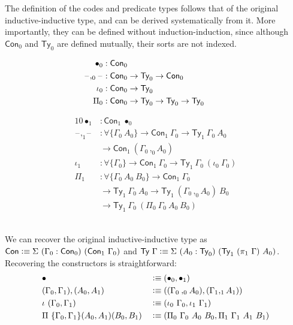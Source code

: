 \documentclass[autoref]{llncs}
\newcommand{\GG}{\Gamma}
\newcommand{\blank}{\mathord{\hspace{1pt}\text{--}\hspace{1pt}}}
\newcommand{\defeq}{\mathrel{\vcentcolon\equiv}}
\begin{document}
The definition of the codes and predicate types follows that of the original
inductive-inductive type, and can be derived systematically from it. More
importantly, they can be defined without induction-induction, since although
$\textsf{Con}_0$ and $\textsf{Ty}_0$ are defined mutually, their sorts are not
indexed. \\
\vspace{-0.2em}
\begin{minipage}{0.4\textwidth}
\begin{align*}
  \bullet_0 &: \textsf{Con}_0 \\
  \blank,_0\blank &: \textsf{Con}_0 \to \textsf{Ty}_0 \to \textsf{Con}_0 \\
  \iota_0 &: \textsf{Con}_0 \to \textsf{Ty}_0 \\
  \Pi_0 &: \textsf{Con}_0 \to \textsf{Ty}_0 \to \textsf{Ty}_0 \to \textsf{Ty}_0 \hspace{2.8em} \\
\end{align*}
\end{minipage}
\begin{minipage}{0.5\textwidth}
\vspace{-1.3em}
\begin{alignat*}{10}
  \bullet_1 &: \textsf{Con}_1\ \bullet_0 \\
  \blank,_1\blank &: \forall\{\GG_0\ A_0\} \to \textsf{Con}_1\ \GG_0 \to \textsf{Ty}_1\ \GG_0\ A_0 \\
  & \to \textsf{Con}_1\ (\GG_0 \,,_0 A_0) \\
  \iota_1 &: \forall\{\GG_0\} \to \textsf{Con}_1\ \GG_0 \to \textsf{Ty}_1\ \GG_0\ (\iota_0\ \GG_0) \\
  \Pi_1 &: \forall\{\GG_0\ A_0\ B_0\} \to \textsf{Con}_1\ \GG_0 \\
  & \to \textsf{Ty}_1\ \GG_0\ A_0 \to \textsf{Ty}_1\ (\GG_0\, ,_0 A_0)\ B_0 \\
  & \to \textsf{Ty}_1\ \GG_0\ (\Pi_0\ \GG_0\ A_0\ B_0)
\end{alignat*}
\end{minipage}
\\

We can recover the original inductive-inductive type as $\textsf{Con} \defeq
\Sigma\ (\GG_0 : \textsf{Con}_0)\ (\textsf{Con}_1\ \GG_0)$ and $\textsf{Ty}\ \GG
\defeq \Sigma\ (A_0 :
\textsf{Ty}_0)\ (\textsf{Ty}_1\ (\pi_1\ \GG)\ A_0)$. Recovering the constructors
is straightforward:
\vspace{-0.2em}
\begin{alignat*}{10}
  & \bullet && \defeq (\bullet_0 , \bullet_1) \\
  & (\GG_0 , \GG_1) , (A_0 , A_1) && \defeq ((\GG_0 \mathbin{,_0} A_0) , (\GG_1 ,_1 A_1)) \\
  & \iota\ (\GG_0 , \GG_1) && \defeq (\iota_0\ \GG_0 , \iota_1\ \GG_1) \\
  & \Pi\ \{\GG_0 , \GG_1\}(A_0 , A_1) (B_0 , B_1) && \defeq
    (\Pi_0\ \GG_0\ A_0\ B_0 , \Pi_1\ \GG_1\ A_1\ B_1)
\end{alignat*}
\end{document}
